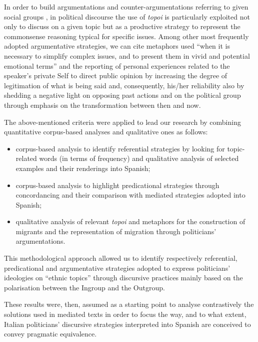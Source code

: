 \documentclass[output=paper]{langscibook}
\begin{document}
In order to build argumentations and counter-argumentations referring to given social groups \citep[45]{ReisiglWodak2001}, in political discourse the use of \textit{topoi} is particularly exploited not only to discuss on a given topic but as a productive strategy to represent the commonsense reasoning typical for specific issues. Among other most frequently adopted argumentative strategies, we can cite metaphors used “when it is necessary to simplify complex issues, and to present them in vivid and potential emotional terms” \citep[124]{Semino2008} and the reporting of personal experiences related to the speaker’s private Self to direct public opinion by increasing the degree of legitimation of what is being said and, consequently, his/her reliability also by shedding a negative light on opposing past actions and on the political group through emphasis on the transformation between then and now.

The above-mentioned criteria were applied to lead our research by combining quantitative corpus-based analyses and qualitative ones as follows:

\begin{itemize}
\item
corpus-based analysis to identify referential strategies by looking for topic-related words (in terms of frequency) and qualitative analysis of selected examples and their renderings into Spanish;
\item
corpus-based analysis to highlight predicational strategies through concordancing and their comparison with mediated strategies adopted into Spanish;
\item
qualitative analysis of relevant \textit{topoi} and metaphors for the construction of migrants and the representation of migration through politicians’ argumentations.
\end{itemize}

This methodological approach allowed us to identify respectively referential, predicational and argumentative strategies adopted to express politicians’ ideologies on “ethnic topics” through discursive practices mainly based on the polarisation between the Ingroup and the Outgroup.

These results were, then, assumed as a starting point to analyse contrastively the solutions used in mediated texts in order to focus the way, and to what extent, Italian politicians’ discursive strategies interpreted into Spanish are conceived to convey pragmatic equivalence.
\end{document}

